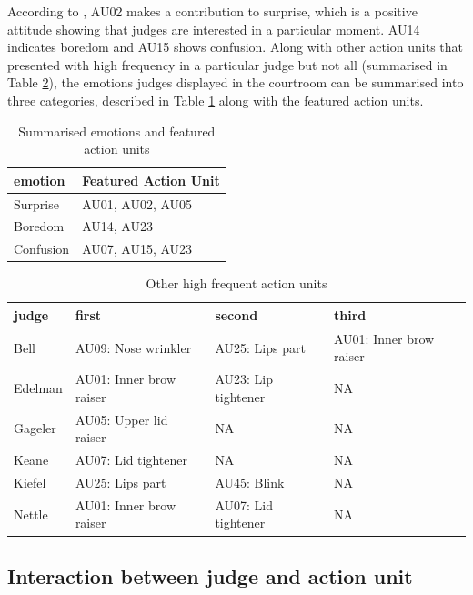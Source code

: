 \documentclass{monashthesis}
\begin{document}
According to \textcite{ekman2002facial}, AU02 makes a contribution to surprise, which is a positive attitude showing that judges are interested in a particular moment. AU14 indicates boredom and AU15 shows confusion. Along with other action units that presented with high frequency in a particular judge but not all (summarised in Table \ref{tab:other_highf}), the emotions judges displayed in the courtroom can be summarised into three categories, described in Table \ref{tab:three_category} along with the featured action units.

\begin{table}

\caption{\label{tab:unnamed-chunk-6}\label{tab:three_category} Summarised emotions and featured action units}
\centering
\begin{tabular}[t]{l|l}
\hline
emotion & Featured Action Unit\\
\hline
Surprise & AU01, AU02, AU05\\
\hline
Boredom & AU14, AU23\\
\hline
Confusion & AU07, AU15, AU23\\
\hline
\end{tabular}
\end{table}

\begin{table}

\caption{\label{tab:unnamed-chunk-7}\label{tab:other_highf} Other high frequent action units }
\centering
\begin{tabular}[t]{l|l|l|l}
\hline
judge & first & second & third\\
\hline
Bell & AU09: Nose wrinkler & AU25: Lips part & AU01: Inner brow raiser\\
\hline
Edelman & AU01: Inner brow raiser & AU23: Lip tightener & NA\\
\hline
Gageler & AU05: Upper lid raiser & NA & NA\\
\hline
Keane & AU07: Lid tightener & NA & NA\\
\hline
Kiefel & AU25: Lips part & AU45: Blink & NA\\
\hline
Nettle & AU01: Inner brow raiser & AU07: Lid tightener & NA\\
\hline
\end{tabular}
\end{table}

\hypertarget{interaction-between-judge-and-action-unit}{%
\subsection{Interaction between judge and action unit}\label{interaction-between-judge-and-action-unit}}
\end{document}
